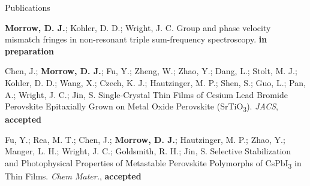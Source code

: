\documentclass{resume} %
\begin{document}
\pagebreak

\begin{rSection}{Publications}
	
\begin{etaremune}
	
\item \textbf{Morrow, D. J.}; Kohler, D. D.; Wright, J. C. Group and phase velocity mismatch fringes in non-resonant triple sum-frequency spectroscopy. \textbf{in preparation}
 
\item Chen, J.; \textbf{Morrow, D. J.}; Fu, Y.; Zheng, W.; Zhao, Y.; Dang, L.; Stolt, M. J.; Kohler, D. D.; Wang, X.; Czech, K. J.; Hautzinger, M. P.; Shen, S.; Guo, L.; Pan, A.; Wright, J. C.; Jin, S. Single-Crystal Thin Films of Cesium Lead Bromide Perovskite Epitaxially Grown on Metal Oxide Perovskite (SrTiO\textsubscript{3}). \emph{JACS}, \textbf{accepted} 
	
\item Fu, Y.; Rea, M. T.; Chen, J.; \textbf{Morrow, D. J.}; Hautzinger, M. P.; Zhao, Y.; Manger, L. H.; Wright, J. C.; Goldsmith, R. H.; Jin, S. Selective Stabilization and Photophysical Properties of
Metastable Perovskite Polymorphs of CsPbI\textsubscript{3} in Thin Films. \emph{Chem Mater.}, \textbf{accepted}


\end{etaremune}

\end{rSection}
\end{document}
